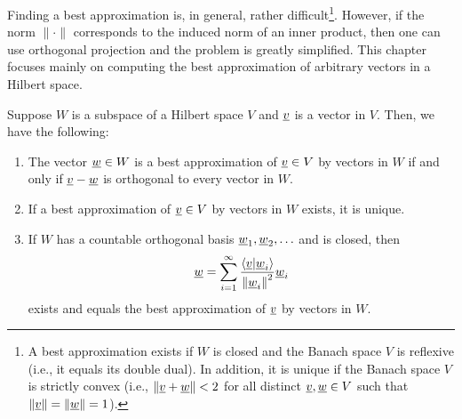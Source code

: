 Finding a best approximation is, in general, rather difficult\footnote{A best approximation exists if $W$ is closed and the Banach space $V$ is reflexive (i.e., it equals its double dual).  In addition, it is unique if the Banach space $V$ is strictly convex (i.e., $\|\underline{v} + \underline{w} \|<2$ for all distinct $\underline{v},\underline{w}\in V$ such that $\|\underline{v}\|=\|\underline{w}\| = 1$).}.
However, if the norm $\| \cdot \|$ corresponds to the induced norm of an inner product, then one can use orthogonal projection and the problem is greatly simplified.
This chapter focuses mainly on computing the best approximation of arbitrary vectors in a Hilbert space.
\begin{theorem} \label{theorem:OrthogonalProjection}
Suppose $W$ is a subspace of a Hilbert space $V$ and $\underline{v}$ is a vector in $V$.
Then, we have the following:
\begin{enumerate}
\item The vector $\underline{w} \in W$ is a best approximation of $\underline{v} \in V$ by vectors in $W$ if and only if $\underline{v} - \underline{w}$ is orthogonal to every vector in $W$.
\item If a best approximation of $\underline{v} \in V$ by vectors in $W$ exists, it is unique.
\item If $W$ has a countable orthogonal basis $\underline{w}_1, \underline{w}_2, \ldots$ and is closed, then
\begin{equation}
\label{equation:OrthogonalProjectionOrthogonalVectors}
\underline{w} = \sum_{i=1}^\infty \frac{ \left\langle \underline{v} | \underline{w}_i \right\rangle }{ \left\| \underline{w}_i \right\|^2 } \underline{w}_i
\end{equation}
exists and equals the best approximation of $\underline{v}$ by vectors in $W$.
\end{enumerate}
\end{theorem}
